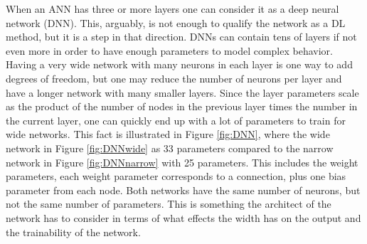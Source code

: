 \documentclass[12pt,a4paper]{article} %
\numberwithin{equation}{section}
\begin{document}
		When an ANN has three or more layers one can consider it as a deep neural network (DNN). This, arguably, is not enough to qualify the network as a DL method, but it is a step in that direction. DNNs can contain tens of layers if not even more in order to have enough parameters to model complex behavior. Having a very wide network with many neurons in each layer is one way to add degrees of freedom, but one may reduce the number of neurons per layer and have a longer network with many smaller layers. Since the layer parameters scale as the product of the number of nodes in the previous layer times the number in the current layer, one can quickly end up with a lot of parameters to train for wide networks. This fact is illustrated in Figure \ref{fig:DNN}, where the wide network in Figure \ref{fig:DNNwide} as 33 parameters compared to the narrow network in Figure \ref{fig:DNNnarrow} with 25 parameters. This includes the weight parameters, each weight parameter corresponds to a connection, plus one bias parameter from each node. Both networks have the same number of neurons, but not the same number of parameters. This is something the architect of the network has to consider in terms of what effects the width has on the output and the trainability of the network.
		
\end{document}
